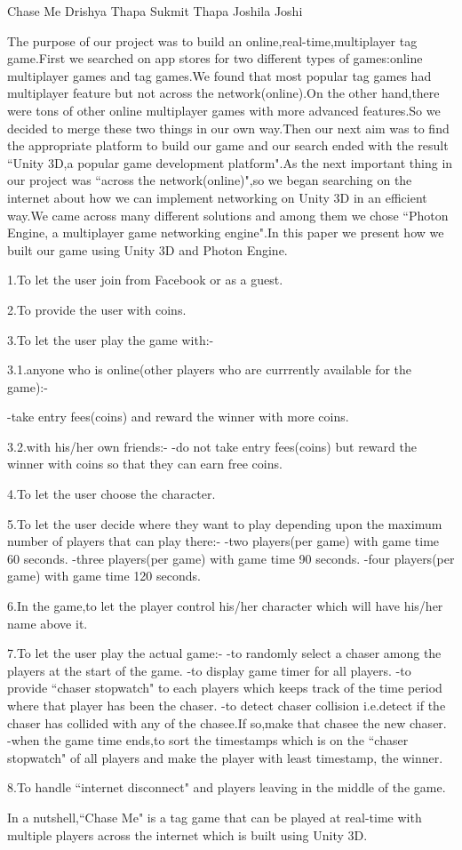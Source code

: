  \begin{conf-abstract}[]
 {Chase Me}
 {Drishya Thapa
 	Sukmit Thapa 
 	Joshila Joshi
 }
{}

The purpose of our project was to build an online,real-time,multiplayer tag game.First we searched on app stores for two different types of games:online multiplayer games and tag games.We found that most popular tag games had multiplayer feature but not across the network(online).On the other hand,there were tons of other online multiplayer games with more advanced features.So we decided to merge these two things in our own way.Then our next aim was to find the appropriate platform to build our game and our search ended with the result ``Unity 3D,a popular game development platform".As the next important thing in our project was ``across the network(online)",so we began searching on the internet about how we can  implement networking on Unity 3D in an efficient way.We came across many different solutions and among them we chose ``Photon Engine, a multiplayer game networking engine".In this paper we present how we built our game using Unity 3D and Photon Engine.

1.To let the user join from Facebook or as a guest.

2.To provide the user with coins.

3.To let the user play the game with:-

3.1.anyone who is online(other players who are currrently available for the game):-

-take entry fees(coins) and reward the winner with more coins.

3.2.with his/her own friends:-
-do not take entry fees(coins) but reward the winner with coins so that they can earn free coins.

4.To let the user choose the character.

5.To let the user decide where they want to play depending upon the maximum number of players that can play there:-
-two players(per game) with game time 60 seconds.
-three players(per game) with game time 90 seconds.
-four players(per game) with game time 120 seconds.

6.In the game,to let the player control his/her character which will have his/her name above it.

7.To let the user play the actual game:-
-to randomly select a chaser among the players at the start of the game.
-to display game timer for all players.
-to provide ``chaser stopwatch" to each players which keeps track of the time period where that player has been the chaser.
-to detect chaser collision i.e.detect if the chaser has collided with any of the chasee.If so,make that chasee the new chaser.
-when the game time ends,to sort the timestamps which is on the ``chaser stopwatch" of all players and make the player with            
least  timestamp, the winner.  

8.To handle ``internet disconnect" and players leaving in the middle of the game.



In a nutshell,``Chase Me" is a tag game that can be played at real-time with multiple players across the internet which is built using Unity 3D. 
 \end{conf-abstract}